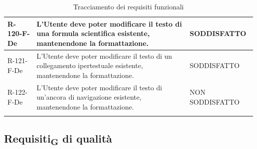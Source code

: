 \documentclass[a4paper, 10pt]{article}
\begin{document}
\begin{longtable}{|p{2.1cm}|p{9.6cm}|p{2.6cm}|}
    R-120-F-De & L'Utente deve poter modificare il testo di una formula scientifica esistente, mantenendone la formattazione. & SODDISFATTO \\ \hline
    R-121-F-De & L'Utente deve poter modificare il testo di un collegamento ipertestuale esistente, mantenendone la formattazione. & SODDISFATTO \\ \hline
    R-122-F-De & L'Utente deve poter modificare il testo di un'ancora di navigazione esistente, mantenendone la formattazione. & NON SODDISFATTO \\ \hline
    \caption{Tracciamento dei requisiti funzionali}\label{tab:tracciamento-funzionali}
\end{longtable}

\subsection{Requisiti\textsubscript{G} di qualità}
\label{sec:tracciamento-qualita}
\end{document}
